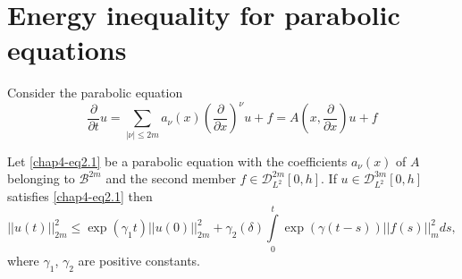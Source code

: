 \section{Energy inequality for parabolic equations}\label{chap4-sec2}%

Consider the parabolic equation 
\begin{equation*}
\frac{\partial}{\partial t} u = \sum\limits_{|\nu|\leq 2m} a_\nu (x)
\left(\frac{\partial }{\partial x}\right)^\nu u+ f = A \left(x,
\frac{\partial }{\partial x}\right) u + f\tag{2.1} \label{chap4-eq2.1}
\end{equation*}

\setcounter{proposition}{0}
\begin{proposition}\label{chap4-sec2-prop1}%
Let \eqref{chap4-eq2.1} be a parabolic equation with the coefficients
$a_\nu (x)$ of 
$A$ belonging to $\mathscr{B}^{2m}$  and the second member $f \in
\mathscr{D}^{2m}_{L^2} [0,h]$. If $u \in
\mathscr{D}^{3m}_{L^2} [0,h]$ satisfies \eqref{chap4-eq2.1} then 	   
\begin{equation*}
|| u (t)||^2_{2m} \leq \exp (\gamma_1 t) || u (0) ||^2_{2m} +
\gamma_2 (\delta) \int\limits^t_0 \exp (\gamma (t - s)) || f(s) ||^2_m
ds, \tag{2.2} \label{chap4-eq2.2} 
\end{equation*}
where $\gamma_1$, $\gamma_2$ are positive constants. 
\end{proposition}

